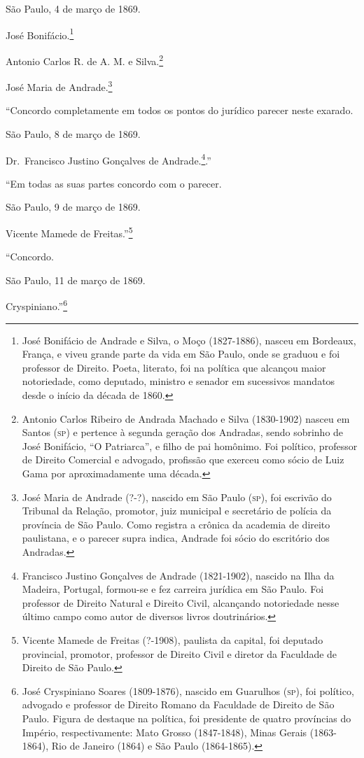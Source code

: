 São Paulo, 4 de março de 1869.

José Bonifácio.\footnote{José Bonifácio de Andrade e Silva, o Moço
  (1827-1886), nasceu em Bordeaux, França, e viveu grande parte da vida
  em São Paulo, onde se graduou e foi professor de Direito. Poeta,
  literato, foi na política que alcançou maior notoriedade, como
  deputado, ministro e senador em sucessivos mandatos desde o início da
  década de 1860.}

Antonio Carlos R. de A. M. e Silva.\footnote{Antonio Carlos Ribeiro de
  Andrada Machado e Silva (1830-1902) nasceu em Santos (\textsc{sp}) e pertence à
  segunda geração dos Andradas, sendo sobrinho de José Bonifácio, ``O
  Patriarca'', e filho de pai homônimo. Foi político, professor de
  Direito Comercial e advogado, profissão que exerceu como sócio de Luiz
  Gama por aproximadamente uma década.}

José Maria de Andrade.\footnote{José Maria de Andrade (?-?),
  nascido em São Paulo (\textsc{sp}), foi escrivão do Tribunal da Relação,
  promotor, juiz municipal e secretário de polícia da província de São
  Paulo. Como registra a crônica da academia de direito paulistana, e o
  parecer supra indica, Andrade foi sócio do escritório dos Andradas.}

``Concordo completamente em todos os pontos do jurídico parecer neste
exarado.

São Paulo, 8 de março de 1869.

Dr.~Francisco Justino Gonçalves de Andrade.\footnote{Francisco 
Justino Gonçalves de Andrade (1821-1902), nascido na Ilha da Madeira,
  Portugal, formou-se e fez carreira jurídica em São Paulo. Foi
  professor de Direito Natural e Direito Civil, alcançando notoriedade
  nesse último campo como autor de diversos livros doutrinários.}.''

``Em todas as suas partes concordo com o parecer.

São Paulo, 9 de março de 1869.

Vicente Mamede de Freitas.''\footnote{Vicente Mamede de Freitas
  (?-1908), paulista da capital, foi deputado provincial, promotor,
  professor de Direito Civil e diretor da Faculdade de Direito de São
  Paulo.}

``Concordo.

São Paulo, 11 de março de 1869.

Cryspiniano.''\footnote{José Cryspiniano Soares (1809-1876),
  nascido em Guarulhos (\textsc{sp}), foi político, advogado e professor de
  Direito Romano da Faculdade de Direito de São Paulo. Figura de
  destaque na política, foi presidente de quatro províncias do Império,
  respectivamente: Mato Grosso (1847-1848), Minas Gerais (1863-1864),
  Rio de Janeiro (1864) e São Paulo (1864-1865).}

